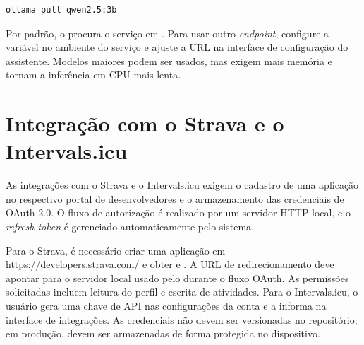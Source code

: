 \begin{verbatim}
ollama pull qwen2.5:3b
\end{verbatim}

Por padrão, o \argus{} procura o serviço em . Para
usar outro \textit{endpoint}, configure a variável  no
ambiente do serviço e ajuste a URL na interface de configuração do assistente.
Modelos maiores podem ser usados, mas exigem mais memória e tornam a inferência
em CPU mais lenta.

\section{Integração com o Strava e o Intervals.icu}
\label{ap:ambiente-strava}

As integrações com o Strava e o Intervals.icu exigem o cadastro de uma
aplicação no respectivo portal de desenvolvedores e o armazenamento das
credenciais de OAuth 2.0. O fluxo de autorização é realizado por um servidor
HTTP local, e o \textit{refresh token} é gerenciado automaticamente pelo
sistema.

Para o Strava, é necessário criar uma aplicação em
\url{https://developers.strava.com/} e obter  e
. A URL de redirecionamento deve apontar para o servidor
local usado pelo \argus{} durante o fluxo OAuth. As permissões solicitadas
incluem leitura do perfil e escrita de atividades. Para o Intervals.icu, o
usuário gera uma chave de API nas configurações da conta e a informa na
interface de integrações. As credenciais não devem ser versionadas no
repositório; em produção, devem ser armazenadas de forma protegida no
dispositivo.
